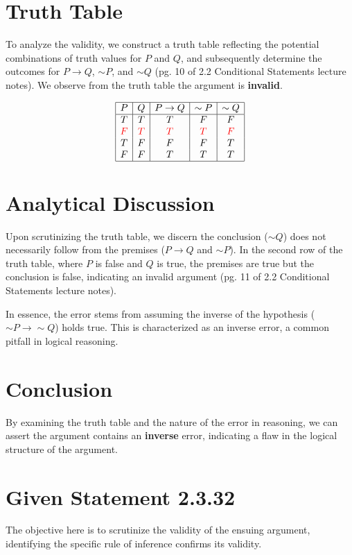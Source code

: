 \documentclass[12pt]{article}
\begin{document}
\section*{Truth Table}
To analyze the validity, we construct a truth table reflecting the potential combinations of truth values for \( P \) and \( Q \), and subsequently determine the outcomes for \( P \rightarrow Q \), \( \sim P \), and \( \sim Q \) (pg. 10 of 2.2 Conditional Statements lecture notes). We observe from the truth table the argument is {\bf{invalid}}.

\[
\begin{array}{|c|c|c|c|c|}
\hline
P & Q & P \rightarrow Q & \sim P & \sim Q \\
\hline
T & T & T & F & F \\
\color{red}{F} & \color{red}{T} & \color{red}{T} & \color{red}{T} & \color{red}{F} \\
T & F & F & F & T \\
F & F & T & T & T \\
\hline
\end{array}
\]

\section*{Analytical Discussion}
Upon scrutinizing the truth table, we discern the conclusion (\( \sim Q \)) does not necessarily follow from the premises (\( P \rightarrow Q \) and \( \sim P \)). In the second row of the truth table, where \( P \) is false and \( Q \) is true, the premises are true but the conclusion is false, indicating an invalid argument (pg. 11 of 2.2 Conditional Statements lecture notes).

In essence, the error stems from assuming the inverse of the hypothesis (\( \sim P \rightarrow \sim Q \)) holds true. This is characterized as an inverse error, a common pitfall in logical reasoning.

\section*{Conclusion}
By examining the truth table and the nature of the error in reasoning, we can assert the argument contains an {\bf{inverse}} error, indicating a flaw in the logical structure of the argument. 

\section*{Given Statement 2.3.32}
The objective here is to scrutinize the validity of the ensuing argument, identifying the specific rule of inference confirms its validity.
\end{document}

